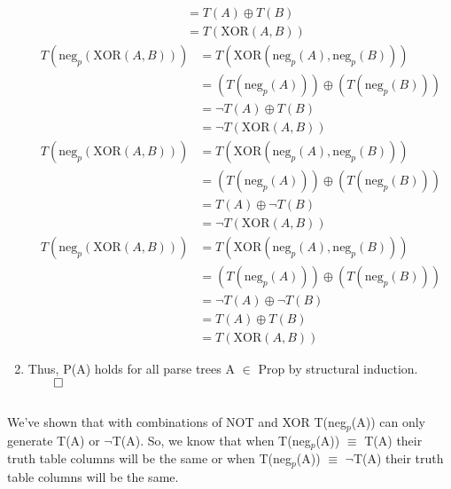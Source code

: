 \documentclass[11pt]{article}
\begin{document}
\begin{enumerate}
\begin{align*}
			&= T(A) \oplus T(B) \tag*{Inductive Hypothesis} \\
			&= T(\text{XOR}(A, B)) \tag*{Definition of T}
		\end{align*}
		\begin{align*}
			T(\text{neg}_p(\text{XOR}(A, B))) &= T(\text{XOR}(\text{neg}_p(A), \text{neg}_p(B))) \tag*{Definition of ngz} \\
			&= (T(\text{neg}_p(A))) \oplus (T(\text{neg}_p(B))) \tag*{Definition of T} \\
			&= \neg T(A) \oplus T(B) \tag*{Inductive Hypothesis} \\
			&= \neg T(\text{XOR}(A, B)) \tag*{Definition of T}
		\end{align*}
		\begin{align*}
			T(\text{neg}_p(\text{XOR}(A, B))) &= T(\text{XOR}(\text{neg}_p(A), \text{neg}_p(B))) \tag*{Definition of ngz} \\
			&= (T(\text{neg}_p(A))) \oplus (T(\text{neg}_p(B))) \tag*{Definition of T} \\
			&= T(A) \oplus \neg T(B) \tag*{Inductive Hypothesis} \\
			&= \neg T(\text{XOR}(A, B)) \tag*{Definition of T}
		\end{align*}
		\begin{align*}
			T(\text{neg}_p(\text{XOR}(A, B))) &= T(\text{XOR}(\text{neg}_p(A), \text{neg}_p(B))) \tag*{Definition of ngz} \\
			&= (T(\text{neg}_p(A))) \oplus (T(\text{neg}_p(B))) \tag*{Definition of T} \\
			&= \neg T(A) \oplus \neg T(B) \tag*{Inductive Hypothesis} \\
			&= T(A) \oplus T(B) \tag*{Definition of $\oplus$} \\
			&= T(\text{XOR}(A, B)) \tag*{Definition of T}
		\end{align*}
	\item Thus, P(A) holds for all parse trees A $\in$ Prop by structural induction. $\qed$
\end{enumerate}

\subsection{} %
We've shown that with combinations of NOT and XOR T(neg$_p$(A)) can only generate T(A) or $\neg$T(A). So, we know that when T(neg$_p$(A)) $\equiv$ T(A) their truth table columns will be the same or when T(neg$_p$(A)) $\equiv$ $\neg$T(A) their truth table columns will be the same. 
\end{document}
